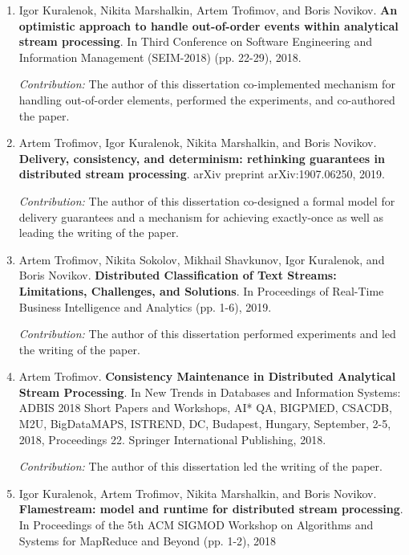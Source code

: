 \begin{enumerate}
    \item Igor Kuralenok, Nikita Marshalkin, Artem Trofimov, and Boris Novikov. \textbf{An optimistic approach to handle out-of-order events within analytical stream processing}. In Third Conference on Software Engineering and Information Management (SEIM-2018) (pp. 22-29), 2018. \newline
    
    \textit{Contribution:} The author of this dissertation co-implemented mechanism for handling out-of-order elements, performed the experiments, and co-authored the paper.

    \item Artem Trofimov, Igor Kuralenok, Nikita Marshalkin, and Boris Novikov. \textbf{Delivery, consistency, and determinism: rethinking guarantees in distributed stream processing}. arXiv preprint arXiv:1907.06250, 2019. \newline
    
    \textit{Contribution:} The author of this dissertation co-designed a formal model for delivery guarantees and a mechanism for achieving exactly-once as well as leading the writing of the paper.

    \item Artem Trofimov, Nikita Sokolov, Mikhail Shavkunov, Igor Kuralenok, and Boris Novikov. \textbf{Distributed Classification of Text Streams: Limitations, Challenges, and Solutions}. In Proceedings of Real-Time Business Intelligence and Analytics (pp. 1-6), 2019. \newline
    
    \textit{Contribution:} The author of this dissertation performed experiments and led the writing of the paper.

    \item Artem Trofimov. \textbf{Consistency Maintenance in Distributed Analytical Stream Processing}. In New Trends in Databases and Information Systems: ADBIS 2018 Short Papers and Workshops, AI* QA, BIGPMED, CSACDB, M2U, BigDataMAPS, ISTREND, DC, Budapest, Hungary, September, 2-5, 2018, Proceedings 22. Springer International Publishing, 2018. \newline
    
    \textit{Contribution:} The author of this dissertation led the writing of the paper.

    \item Igor Kuralenok, Artem Trofimov, Nikita Marshalkin, and Boris Novikov. \textbf{Flamestream: model and runtime for distributed stream processing}. In Proceedings of the 5th ACM SIGMOD Workshop on Algorithms and Systems for MapReduce and Beyond (pp. 1-2), 2018 \newline
    

\end{enumerate}
